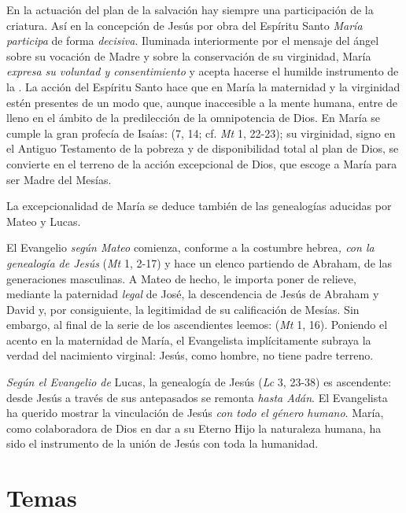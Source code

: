 \begin{body}
\begin{body}
En la actuación del plan de la salvación hay siempre una participación de la criatura. Así en la concepción de Jesús por obra del Espíritu Santo \emph{María participa} de forma \emph{decisiva}. Iluminada interiormente por el mensaje del ángel sobre su vocación de Madre y sobre la conservación de su virginidad, María \emph{expresa su voluntad y consentimiento} y acepta hacerse el humilde instrumento de la . La acción del Espíritu Santo hace que en María la maternidad y la virginidad estén presentes de un modo que, aunque inaccesible a la mente humana, entre de lleno en el ámbito de la predilección de la omnipotencia de Dios. En María se cumple la gran profecía de Isaías:  (7, 14; cf. \emph{Mt} 1, 22-23); su virginidad, signo en el Antiguo Testamento de la pobreza y de disponibilidad total al plan de Dios, se convierte en el terreno de la acción excepcional de Dios, que escoge a María para ser Madre del Mesías.

La excepcionalidad de María se deduce también de las genealogías aducidas por Mateo y Lucas.

El Evangelio \emph{según Mateo} comienza, conforme a la costumbre hebrea\emph{, con la genealogía de Jesús} (\emph{Mt} 1, 2-17) y hace un elenco partiendo de Abraham, de las generaciones masculinas. A Mateo de hecho, le importa poner de relieve, mediante la paternidad \emph{legal} de José, la descendencia de Jesús de Abraham y David y, por consiguiente, la legitimidad de su calificación de Mesías. Sin embargo, al final de la serie de los ascendientes leemos:  (\emph{Mt} 1, 16). Poniendo el acento en la maternidad de María, el Evangelista implícitamente subraya la verdad del nacimiento virginal: Jesús, como hombre, no tiene padre terreno.

\emph{Según el Evangelio de} Lucas, la genealogía de Jesús (\emph{Lc} 3, 23-38) es ascendente: desde Jesús a través de sus antepasados se remonta \emph{hasta Adán}. El Evangelista ha querido mostrar la vinculación de Jesús \emph{con todo el género humano}. María, como colaboradora de Dios en dar a su Eterno Hijo la naturaleza humana, ha sido el instrumento de la unión de Jesús con toda la humanidad.

\section{Temas}


\end{body}
\end{body}
